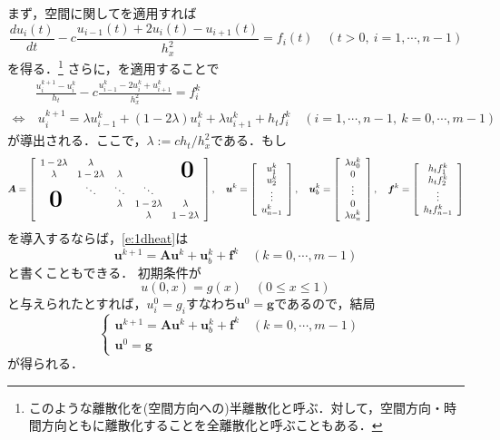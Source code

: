 まず，空間に関してを適用すれば
\begin{equation}
\frac{du_i(t)}{dt}-c\frac{u_{i-1}(t)+2u_i(t)-u_{i+1}(t)}{h_x^2}=f_i(t)\quad(t>0,\ i=1,\cdots,n-1)
\end{equation}
を得る．\footnote{このような離散化を(空間方向への)半離散化と呼ぶ．対して，空間方向・時間方向ともに離散化することを全離散化と呼ぶこともある．}
さらに，を適用することで
\begin{align}
&\frac{u^{k+1}_{i}-u^{k}_{i}}{h_t}-c\frac{u^{k}_{i-1}-2u^{k}_{i}+u^{k}_{i+1}}{h_x^{2}}=f_i^k\nonumber\\
\Leftrightarrow&\ u_i^{k+1}=\lambda u_{i-1}^k+(1-2\lambda)u_i^k+\lambda u_{i+1}^k+h_t f_i^k\quad(i=1,\cdots,n-1,\ k=0,\cdots,m-1)\label{e:1dheat}
\end{align}
が導出される．ここで，$\lambda:=ch_t/h_x^{2}$である．もし
\begin{equation}
\bm{A}=\left[\begin{array}{ccccc}
	1-2\lambda&\lambda&&&\\
	\lambda&1-2\lambda&\lambda&&\hsymb{\bm{0}}\\
	&\ddots&\ddots&\ddots&\\
	\hsymb{\bm{0}}&&\lambda&1-2\lambda&\lambda\\
	&&&\lambda&1-2\lambda
	\end{array}\right],\quad
\bm{u}^k=\left[\begin{array}{c}
	u_1^k\\
	u_2^k\\
	\vdots\\
	u_{n-1}^k
	\end{array}\right],\quad
\bm{u}_b^k=\left[\begin{array}{c}
	\lambda u_0^k\\
	0\\
	\vdots\\
	0\\
	\lambda u_{n}^k
	\end{array}\right],\quad
\bm{f}^k=\left[\begin{array}{c}
	h_t f_1^k\\
	h_t f_2^k\\
	\vdots\\
	h_t f_{n-1}^k
	\end{array}\right]	
\end{equation}
を導入するならば，\eqref{e:1dheat}は
$$
\bm{u}^{k+1}=\bm{A}\bm{u}^k + \bm{u}_b^k+ \bm{f}^k\quad(k=0,\cdots,m-1)
$$
と書くこともできる．
初期条件が
\begin{equation}
\label{e:1dinitial}
u(0,x)=g(x)\quad(0\le x\le1)
\end{equation}
と与えられたとすれば，$u_i^0=g_i$すなわち$\bm{u}^0=\bm{g}$であるので，結局
\begin{equation}
\label{e:1ddiscreteheat}
	\begin{cases}
		\bm{u}^{k+1}=\bm{A}\bm{u}^k + \bm{u}_b^k+ \bm{f}^k\quad(k=0,\cdots,m-1)&\\
		\bm{u}^0=\bm{g}&
	\end{cases}
\end{equation}
が得られる．

